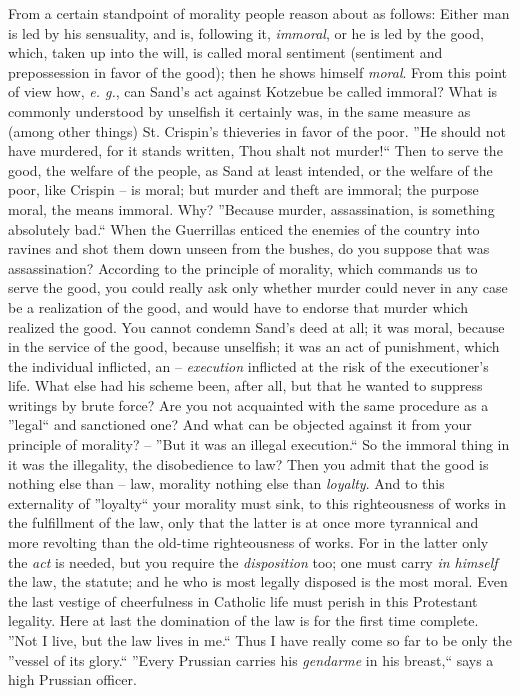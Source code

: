 \documentclass[12pt,a4paper]{book}
\begin{document}
From a certain standpoint of morality people reason about as follows: Either 
man is led by his sensuality, and is, following it, \textit{immoral}, or he is 
led by the good, which, taken up into the will, is called moral sentiment 
(sentiment and prepossession in favor of the good); then he shows himself 
\textit{moral}. From this point of view how, \textit{e. g.}, can Sand's act 
against Kotzebue be called immoral? What is commonly understood by unselfish 
it certainly was, in the same measure as (among other things) St. Crispin's 
thieveries in favor of the poor. ''He should not have murdered, for it stands 
written, Thou shalt not murder!`` Then to serve the good, the welfare of the 
people, as Sand at least intended, or the welfare of the poor, like Crispin -- 
is moral; but murder and theft are immoral; the purpose moral, the means 
immoral. Why? ''Because murder, assassination, is something absolutely 
bad.`` When the Guerrillas enticed the enemies of the country into ravines 
and shot them down unseen from the bushes, do you suppose that was 
assassination? According to the principle of morality, which commands us to 
serve the good, you could really ask only whether murder could never in any 
case be a realization of the good, and would have to endorse that murder which 
realized the good. You cannot condemn Sand's deed at all; it was moral, 
because in the service of the good, because unselfish; it was an act of 
punishment, which the individual inflicted, an -- \textit{execution} inflicted 
at the risk of the executioner's life. What else had his scheme been, after 
all, but that he wanted to suppress writings by brute force? Are you not 
acquainted with the same procedure as a ''legal`` and sanctioned one? And 
what can be objected against it from your principle of morality? -- ''But it 
was an illegal execution.`` So the immoral thing in it was the illegality, 
the disobedience to law? Then you admit that the good is nothing else than -- 
law, morality nothing else than \textit{loyalty}. And to this externality of 
''loyalty`` your morality must sink, to this righteousness of works in the 
fulfillment of the law, only that the latter is at once more tyrannical and 
more revolting than the old-time righteousness of works. For in the latter 
only the \textit{act} is needed, but you require the \textit{disposition} too; 
one must carry \textit{in himself} the law, the statute; and he who is most 
legally disposed is the most moral. Even the last vestige of cheerfulness in 
Catholic life must perish in this Protestant legality. Here at last the 
domination of the law is for the first time complete. ''Not I live, but the 
law lives in me.`` Thus I have really come so far to be only the ''vessel of 
its glory.`` ''Every Prussian carries his \textit{gendarme} in his 
breast,`` says a high Prussian officer.
\end{document}
